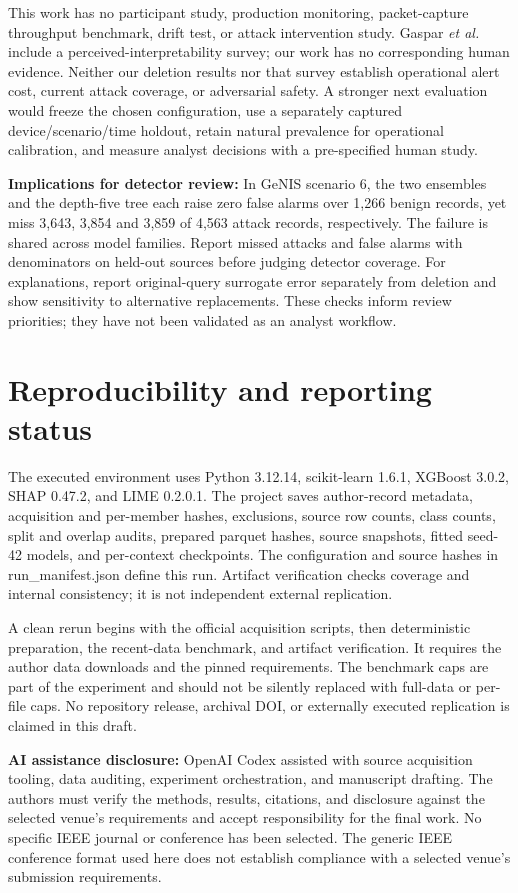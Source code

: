 \documentclass[conference,letterpaper]{IEEEtran}
\begin{document}
This work has no participant study, production monitoring, packet-capture throughput benchmark, drift test, or attack intervention study. Gaspar \emph{et al.} \cite{ref14} include a perceived-interpretability survey; our work has no corresponding human evidence. Neither our deletion results nor that survey establish operational alert cost, current attack coverage, or adversarial safety. A stronger next evaluation would freeze the chosen configuration, use a separately captured device/scenario/time holdout, retain natural prevalence for operational calibration, and measure analyst decisions with a pre-specified human study.

\textbf{Implications for detector review:} In GeNIS scenario 6, the two ensembles and the depth-five tree each raise zero false alarms over 1,266 benign records, yet miss 3,643, 3,854 and 3,859 of 4,563 attack records, respectively. The failure is shared across model families. Report missed attacks and false alarms with denominators on held-out sources before judging detector coverage. For explanations, report original-query surrogate error separately from deletion and show sensitivity to alternative replacements. These checks inform review priorities; they have not been validated as an analyst workflow.

\section{Reproducibility and reporting status}
The executed environment uses Python 3.12.14, scikit-learn 1.6.1, XGBoost 3.0.2, SHAP 0.47.2, and LIME 0.2.0.1. The project saves author-record metadata, acquisition and per-member hashes, exclusions, source row counts, class counts, split and overlap audits, prepared parquet hashes, source snapshots, fitted seed-42 models, and per-context checkpoints. The configuration and source hashes in run\_manifest.json define this run. Artifact verification checks coverage and internal consistency; it is not independent external replication.

A clean rerun begins with the official acquisition scripts, then deterministic preparation, the recent-data benchmark, and artifact verification. It requires the author data downloads and the pinned requirements. The benchmark caps are part of the experiment and should not be silently replaced with full-data or per-file caps. No repository release, archival DOI, or externally executed replication is claimed in this draft.

\textbf{AI assistance disclosure:} OpenAI Codex assisted with source acquisition tooling, data auditing, experiment orchestration, and manuscript drafting. The authors must verify the methods, results, citations, and disclosure against the selected venue's requirements and accept responsibility for the final work. No specific IEEE journal or conference has been selected. The generic IEEE conference format used here does not establish compliance with a selected venue's submission requirements.
\end{document}
